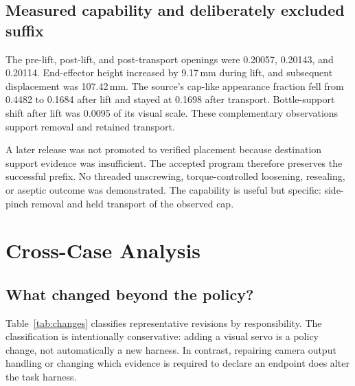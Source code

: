 \subsection{Measured capability and deliberately excluded suffix}
The pre-lift, post-lift, and post-transport openings were 0.20057, 0.20143,
and 0.20114. End-effector height increased by 9.17\,mm during lift, and
subsequent displacement was 107.42\,mm. The source's cap-like appearance
fraction fell from 0.4482 to 0.1684 after lift and stayed at 0.1698 after
transport. Bottle-support shift after lift was 0.0095 of its visual scale.
These complementary observations support removal and retained transport.

A later release was not promoted to verified placement because destination
support evidence was insufficient. The accepted program therefore preserves
the successful prefix. No threaded unscrewing, torque-controlled loosening,
resealing, or aseptic outcome was demonstrated. The capability is useful but
specific: side-pinch removal and held transport of the observed cap.

\section{Cross-Case Analysis}
\subsection{What changed beyond the policy?}
Table~\ref{tab:changes} classifies representative revisions by responsibility.
The classification is intentionally conservative: adding a visual servo is a
policy change, not automatically a new harness. In contrast, repairing camera
output handling or changing which evidence is required to declare an endpoint
does alter the task harness.

